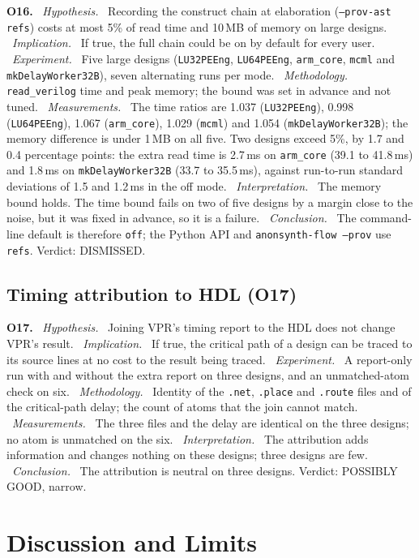 \documentclass[conference]{IEEEtran}
\newcommand{\code}[1]{\texttt{#1}}
\newcommand{\argid}[1]{\par\smallskip\noindent\textbf{#1.}}
\newcommand{\ah}[1]{\ \textit{#1.}\ }
\begin{document}
\argid{O16}
\ah{Hypothesis} Recording the construct chain at elaboration (\code{--prov-ast refs}) costs at most 5\% of read time and 10\,MB of memory on large designs.
\ah{Implication} If true, the full chain could be on by default for every user.
\ah{Experiment} Five large designs (\code{LU32PEEng}, \code{LU64PEEng}, \code{arm\_core}, \code{mcml} and \code{mkDelayWorker32B}), seven alternating runs per mode.
\ah{Methodology} \code{read\_verilog} time and peak memory; the bound was set in advance and not tuned.
\ah{Measurements} The time ratios are 1.037 (\code{LU32PEEng}), 0.998 (\code{LU64PEEng}), 1.067 (\code{arm\_core}), 1.029 (\code{mcml}) and 1.054 (\code{mkDelayWorker32B}); the memory difference is under 1\,MB on all five. Two designs exceed 5\%, by 1.7 and 0.4 percentage points: the extra read time is 2.7\,ms on \code{arm\_core} (39.1 to 41.8\,ms) and 1.8\,ms on \code{mkDelayWorker32B} (33.7 to 35.5\,ms), against run-to-run standard deviations of 1.5 and 1.2\,ms in the off mode.
\ah{Interpretation} The memory bound holds. The time bound fails on two of five designs by a margin close to the noise, but it was fixed in advance, so it is a failure.
\ah{Conclusion} The command-line default is therefore \code{off}; the Python API and \code{anonsynth-flow --prov} use \code{refs}. Verdict: DISMISSED.

\subsection{Timing attribution to HDL (O17)}
\label{sec:q-timing}

\argid{O17}
\ah{Hypothesis} Joining VPR's timing report to the HDL does not change VPR's result.
\ah{Implication} If true, the critical path of a design can be traced to its source lines at no cost to the result being traced.
\ah{Experiment} A report-only run with and without the extra report on three designs, and an unmatched-atom check on six.
\ah{Methodology} Identity of the \code{.net}, \code{.place} and \code{.route} files and of the critical-path delay; the count of atoms that the join cannot match.
\ah{Measurements} The three files and the delay are identical on the three designs; no atom is unmatched on the six.
\ah{Interpretation} The attribution adds information and changes nothing on these designs; three designs are few.
\ah{Conclusion} The attribution is neutral on three designs. Verdict: POSSIBLY GOOD, narrow.

\section{Discussion and Limits}
\label{sec:discussion}
\end{document}
